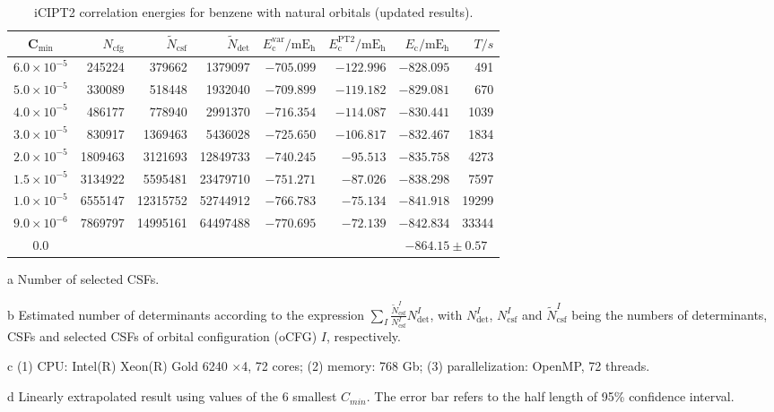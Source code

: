 \documentclass[journal=jcp,manuscript=suppinfo]{achemso}
\begin{document}
\begin{table}[!htp]
	\small
	\caption{iCIPT2 correlation energies for benzene with natural orbitals (updated results).}
\begin{threeparttable}
	\centering
	\begin{tabular}{c|rrrrrrr}\toprule
		C$_{\text{min}}$&$N_{\mathrm{cfg}}$&$\tilde{N}_{\mathrm{csf}}$\tnote{a}&$\tilde{N}_{\mathrm{det}}$\tnote{b}
		&$E_{\mathrm{c}}^{\mathrm{var}}/\mathrm{mE_h}$&$E_{\mathrm{c}}^{\mathrm{PT2}}/\mathrm{mE_h}$&$E_{\mathrm{c}}/\mathrm{mE_h}$&$T/s$\tnote{c}\\\toprule
		$6.0\times10^{-5}$ &   245224 &   379662 & 1379097
		&  $-705.099$  &  $-122.996$&  $-828.095$ &491\\
		$5.0\times10^{-5}$ &   330089 &   518448 & 1932040
		&  $-709.899$  &  $-119.182$&  $-829.081$ &670\\
		$4.0\times10^{-5}$ &   486177 &   778940 & 2991370
		&  $-716.354$  &  $-114.087$&  $-830.441$ &1039\\
		$3.0\times10^{-5}$ &   830917 &  1369463 & 5436028
		&  $-725.650$  &  $-106.817$&  $-832.467$ &1834\\
		$2.0\times10^{-5}$ &  1809463 &  3121693 &12849733
		&  $-740.245$  &  $-95.513$&  $-835.758$ &4273\\
		$1.5\times10^{-5}$ &  3134922 &  5595481 &23479710
		&  $-751.271$  &  $-87.026$&  $-838.298$ &7597\\
		$1.0\times10^{-5}$ &  6555147 & 12315752 &52744912
		&  $-766.783$  &  $-75.134$&  $-841.918$ &19299\\
		$9.0\times10^{-6}$ &  7869797 & 14995161 &64497488
		&  $-770.695$  &  $-72.139$&  $-842.834$ &33344\\\midrule
		0.0\tnote{d}&&&&&&\multicolumn{2}{c}{$-864.15\pm0.57$}\\\bottomrule
	\end{tabular}
\begin{tablenotes}
	\item[a]Number of selected CSFs.
	\item[b]Estimated number of determinants according to the expression $\sum_I\frac{\tilde{N}_{\mathrm{csf}}^I}{N_{\mathrm{csf}}^I}N_{\mathrm{det}}^I$, with $N_{\mathrm{det}}^I$, $N_{\mathrm{csf}}^I$ and $\tilde{N}_{\mathrm{csf}}^I$ being the numbers of determinants, CSFs and selected CSFs of orbital configuration (oCFG) $I$, respectively.
	\item[c](1) CPU: Intel(R) Xeon(R) Gold 6240 $\times$4, 72 cores; (2) memory: 768 Gb; (3) parallelization: OpenMP, 72 threads.
	\item[d]Linearly extrapolated result using values of the 6 smallest $C_{min}$. The error bar refers to the half length of 95\% confidence interval.
\end{tablenotes}
\end{threeparttable}
\label{NewNO}
\end{table}
\end{document}
